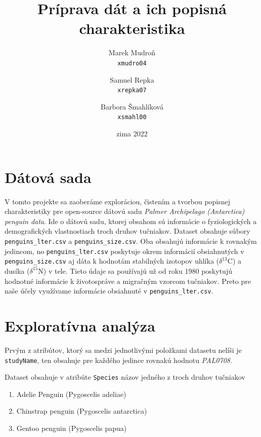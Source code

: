 \documentclass[10pt,xcolor=pdflatex,dvipsnames,table,oneside]{book}
\author{
  Marek Mudroň\\
  \texttt{xmudro04}
  \and
  Samuel Repka\\
  \texttt{xrepka07}
  \and
  Barbora Šmahlíková\\
  \texttt{xsmahl00}
}
\title{Príprava dát a ich popisná charakteristika}
\date{zima 2022}
\begin{document}

\hypersetup{pageanchor=false}%
\maketitle
\hypersetup{pageanchor=true}
\tableofcontents

\newpage%


\chapter{Dátová sada}

V tomto projekte sa zaoberáme exploráciou, čistením a tvorbou popisnej charakteristiky pre open-source dátovú sadu 
\textit{Palmer Archipelago (Antarctica) penguin data}. Ide o dátovú sadu, ktorej obsahom sú informácie o fyziologických a demografických vlastnostiach troch druhov tučniakov. Dataset obsahuje súbory \texttt{penguins\_lter.csv} a \texttt{penguins\_size.csv}. Oba obsahujú informácie k rovnakým jedincom,  no \texttt{penguins\_lter.csv} poskytuje okrem informácií obsiahnutých v \texttt{penguins\_size.csv} aj dáta k hodnotám stabilných izotopov uhlíka  ($\delta^{13}$C)  a dusíka  ($\delta^{15}$N)  v tele. Tieto údaje sa používajú už od roku 1980  poskytujú hodnotné informácie k životospráve a migračným vzorcom tučniakov. Preto pre naše účely využívame informácie obsiahnuté v \texttt{penguins\_lter.csv}.

\chapter{Exploratívna analýza}

Prvým z atribútov, ktorý sa medzi jednotlivými položkami datasetu nelíši je \texttt{studyName}, ten obsahuje pre každého jedince rovnakú hodnotu \textit{PAL0708}.

Dataset obsahuje v atribúte \texttt{Species} názov jedného z troch druhov  tučniakov
\begin{enumerate}
  \item Adelie Penguin (Pygoscelis adeliae)
  \item Chinstrap penguin (Pygoscelis antarctica)
  \item Gentoo penguin (Pygoscelis papua)
\end{enumerate}
\end{document}
